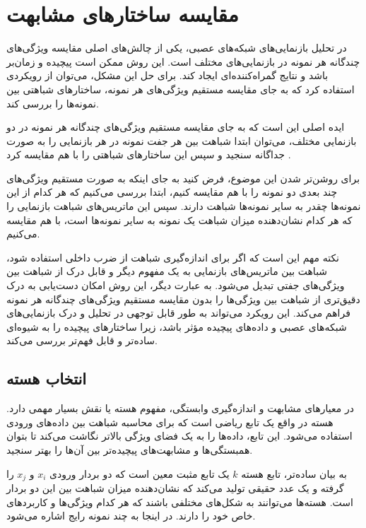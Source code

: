 \section{مقایسه ساختارهای مشابهت}
در تحلیل بازنمایی‌های شبکه‌های عصبی، یکی از چالش‌های اصلی مقایسه ویژگی‌های چندگانه هر نمونه در بازنمایی‌های مختلف است. این روش ممکن است پیچیده و زمان‌بر باشد و نتایج گمراه‌کننده‌ای ایجاد کند. برای حل این مشکل، می‌توان از رویکردی استفاده کرد که به جای مقایسه مستقیم ویژگی‌های هر نمونه، ساختارهای شباهتی بین نمونه‌ها را بررسی کند.

ایده اصلی این است که به جای مقایسه مستقیم ویژگی‌های چندگانه هر نمونه در دو بازنمایی مختلف، می‌توان ابتدا شباهت بین هر جفت نمونه در هر بازنمایی را به صورت جداگانه سنجید و سپس این ساختارهای شباهتی را با هم مقایسه کرد
\cite{kornblith2019similarity}.

برای روشن‌تر شدن این موضوع، فرض کنید به جای اینکه به صورت مستقیم ویژگی‌های چند بعدی دو نمونه را با هم مقایسه کنیم، ابتدا بررسی می‌کنیم که هر کدام از این نمونه‌ها چقدر به سایر نمونه‌ها شباهت دارند. سپس این ماتریس‌های شباهت بازنمایی را که هر کدام نشان‌دهنده میزان شباهت یک نمونه به سایر نمونه‌ها است، با هم مقایسه می‌کنیم.

نکته مهم این است که اگر برای اندازه‌گیری شباهت از ضرب داخلی استفاده شود، شباهت بین ماتریس‌های بازنمایی به یک مفهوم دیگر و قابل درک از شباهت بین ویژگی‌های جفتی تبدیل می‌شود. به عبارت دیگر، این روش امکان دست‌یابی به درک دقیق‌تری از شباهت بین ویژگی‌ها را بدون مقایسه مستقیم ویژگی‌های چندگانه هر نمونه فراهم می‌کند. این رویکرد می‌تواند به طور قابل توجهی در تحلیل و درک بازنمایی‌های شبکه‌های عصبی و داده‌های پیچیده مؤثر باشد، زیرا ساختارهای پیچیده را به شیوه‌ای ساده‌تر و قابل فهم‌تر بررسی می‌کند.



\subsection{
	انتخاب هسته%
}
در معیارهای مشابهت و اندازه‌گیری وابستگی، مفهوم هسته یا
نقش بسیار مهمی دارد. هسته در واقع یک تابع ریاضی است که برای محاسبه شباهت بین داده‌های ورودی استفاده می‌شود. این تابع، داده‌ها را به یک فضای ویژگی بالاتر نگاشت می‌کند تا بتوان همبستگی‌ها و مشابهت‌های پیچیده‌تر بین آن‌ها را بهتر سنجید.

به بیان ساده‌تر، تابع هسته \( k \) یک تابع مثبت معین است که دو بردار ورودی \( x_i \) و \( x_j \) را گرفته و یک عدد حقیقی تولید می‌کند که نشان‌دهنده میزان شباهت بین این دو بردار است. هسته‌ها می‌توانند به شکل‌های مختلفی باشند که هر کدام ویژگی‌ها و کاربردهای خاص خود را دارند. در اینجا به چند نمونه رایج اشاره می‌شود.


